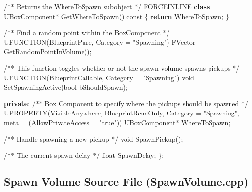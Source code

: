 \documentclass[
  letterpaper,
  DIV=11,
  numbers=noendperiod]{scrartcl}
\newenvironment{Shaded}{\begin{snugshade}}{\end{snugshade}}
\newcommand{\AttributeTok}[1]{\textcolor[rgb]{0.40,0.45,0.13}{#1}}
\newcommand{\CommentTok}[1]{\textcolor[rgb]{0.37,0.37,0.37}{#1}}
\newcommand{\ControlFlowTok}[1]{\textcolor[rgb]{0.00,0.23,0.31}{\textbf{#1}}}
\newcommand{\DataTypeTok}[1]{\textcolor[rgb]{0.68,0.00,0.00}{#1}}
\newcommand{\KeywordTok}[1]{\textcolor[rgb]{0.00,0.23,0.31}{\textbf{#1}}}
\newcommand{\NormalTok}[1]{\textcolor[rgb]{0.00,0.23,0.31}{#1}}
\newcommand{\OperatorTok}[1]{\textcolor[rgb]{0.37,0.37,0.37}{#1}}
\newcommand{\StringTok}[1]{\textcolor[rgb]{0.13,0.47,0.30}{#1}}
\begin{document}
\begin{Shaded}
\begin{Highlighting}[]
    \CommentTok{/** Returns the WhereToSpawn subobject */}
\NormalTok{    FORCEINLINE }\KeywordTok{class}\NormalTok{ UBoxComponent}\OperatorTok{*}\NormalTok{ GetWhereToSpawn}\OperatorTok{()} \AttributeTok{const} \OperatorTok{\{} \ControlFlowTok{return}\NormalTok{ WhereToSpawn}\OperatorTok{;} \OperatorTok{\}}
    
    \CommentTok{/** Find a random point within the BoxComponent */}
\NormalTok{    UFUNCTION}\OperatorTok{(}\NormalTok{BlueprintPure}\OperatorTok{,}\NormalTok{ Category }\OperatorTok{=} \StringTok{"Spawning"}\OperatorTok{)}
\NormalTok{    FVector GetRandomPointInVolume}\OperatorTok{();}
    
    \CommentTok{/** This function toggles whether or not the spawn volume spawns pickups */}
\NormalTok{    UFUNCTION}\OperatorTok{(}\NormalTok{BlueprintCallable}\OperatorTok{,}\NormalTok{ Category }\OperatorTok{=} \StringTok{"Spawning"}\OperatorTok{)}
    \DataTypeTok{void}\NormalTok{ SetSpawningActive}\OperatorTok{(}\DataTypeTok{bool}\NormalTok{ bShouldSpawn}\OperatorTok{);}

\KeywordTok{private}\OperatorTok{:}
    \CommentTok{/** Box Component to specify where the pickups should be spawned */}
\NormalTok{    UPROPERTY}\OperatorTok{(}\NormalTok{VisibleAnywhere}\OperatorTok{,}\NormalTok{ BlueprintReadOnly}\OperatorTok{,}\NormalTok{ Category }\OperatorTok{=} \StringTok{"Spawning"}\OperatorTok{,}\NormalTok{ meta }\OperatorTok{=} \OperatorTok{(}\NormalTok{AllowPrivateAccess }\OperatorTok{=} \StringTok{"true"}\OperatorTok{))}
\NormalTok{    UBoxComponent}\OperatorTok{*}\NormalTok{ WhereToSpawn}\OperatorTok{;}
    
    \CommentTok{/** Handle spawning a new pickup */}
    \DataTypeTok{void}\NormalTok{ SpawnPickup}\OperatorTok{();}
    
    \CommentTok{/** The current spawn delay */}
    \DataTypeTok{float}\NormalTok{ SpawnDelay}\OperatorTok{;}
\OperatorTok{\};}
\end{Highlighting}
\end{Shaded}

\subsection{Spawn Volume Source File
(SpawnVolume.cpp)}\label{spawn-volume-source-file-spawnvolume.cpp}
\end{document}
